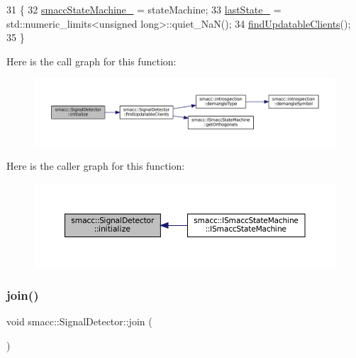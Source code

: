 \begin{DoxyCode}
31     \{
32         \hyperlink{classsmacc_1_1SignalDetector_a46025de6ac7b5980e22144f9703236a4}{smaccStateMachine\_} = stateMachine;
33         \hyperlink{classsmacc_1_1SignalDetector_a72293ed0e98f4200fbe75b53f1e41eab}{lastState\_} = std::numeric\_limits<unsigned long>::quiet\_NaN();
34         \hyperlink{classsmacc_1_1SignalDetector_a47ec2df560e2e33758ce3975bece9385}{findUpdatableClients}();
35     \}
\end{DoxyCode}
Here is the call graph for this function\+:
\nopagebreak
\begin{figure}[H]
\begin{center}
\leavevmode
\includegraphics[width=350pt]{classsmacc_1_1SignalDetector_a91ab3cd92d8095cdaf8610b50731f04b_cgraph}
\end{center}
\end{figure}
Here is the caller graph for this function\+:
\nopagebreak
\begin{figure}[H]
\begin{center}
\leavevmode
\includegraphics[width=350pt]{classsmacc_1_1SignalDetector_a91ab3cd92d8095cdaf8610b50731f04b_icgraph}
\end{center}
\end{figure}
\mbox{\label{classsmacc_1_1SignalDetector_a636f704e469bf74b4a9fdb15bd63d5be}} 
\subsubsection{\texorpdfstring{join()}{join()}}
{\footnotesize\ttfamily void smacc\+::\+Signal\+Detector\+::join (\begin{DoxyParamCaption}{ }\end{DoxyParamCaption})}


